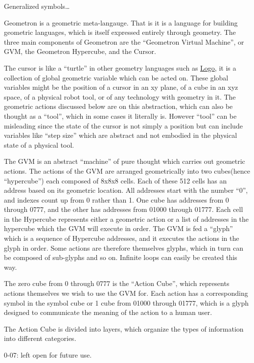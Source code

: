 Generalized symbols\ldots{}

Geometron is a geometric meta-langauge. That is it is a language for
building geometric languages, which is itself expressed entirely through
geometry. The three main components of Geometron are the ``Geometron
Virtual Machine'', or GVM, the Geometron Hypercube, and the Cursor.

The cursor is like a ``turtle'' in other geometry languages such as
\href{https://en.wikipedia.org/wiki/Logo_(programming_language)}{Logo},
it is a collection of global geometric variable which can be acted on.
These global variables might be the position of a cursor in an xy plane,
of a cube in an xyz space, of a physical robot tool, or of any
technology with geometry in it. The geometric actions discussed below
are on this abstraction, which can also be thought as a ``tool'', which
in some cases it literally is. However ``tool'' can be misleading since
the state of the cursor is not simply a position but can include
variables like ``step size'' which are abstract and not embodied in the
physical state of a physical tool.

The GVM is an abstract ``machine'' of pure thought which carries out
geometric actions. The actions of the GVM are arranged geometrically
into two cubes(hence ``hypercube'') each composed of 8x8x8 cells. Each
of these 512 cells has an address based on its geometric location. All
addresses start with the number ``0'', and indexes count up from 0
rather than 1. One cube has addresses from 0 through 0777, and the other
has addresses from 01000 through 01777. Each cell in the Hypercube
represents either a geometric action or a list of addresses in the
hypercube which the GVM will execute in order. The GVM is fed a
``glyph'' which is a sequence of Hypercube addresses, and it executes
the actions in the glyph in order. Some actions are therefore themselves
glyphs, which in turn can be composed of sub-glyphs and so on. Infinite
loops can easily be created this way.

The zero cube from 0 through 0777 is the ``Action Cube'', which
represents actions themselves we wish to use the GVM for. Each action
has a corresponding symbol in the symbol cube or 1 cube from 01000
through 01777, which is a glyph designed to communicate the meaning of
the action to a human user.

The Action Cube is divided into layers, which organize the types of
information into different categories.

0-07: left open for future use.

